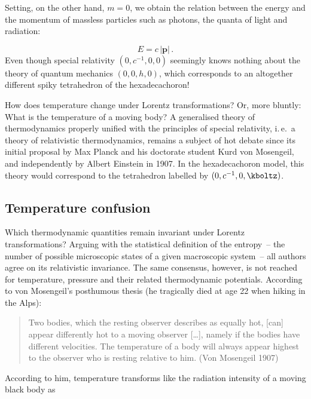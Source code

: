 \documentclass{scrartcl}
\begin{document}
Setting, on the other hand, $m=0$, we obtain the relation between the energy and the momentum of massless particles such as photons, the quanta of light and radiation:

\begin{equation*}\label{emc2}
  E=c\, |\mathbf{p}|\,.
\end{equation*}
%
Even though special relativity $(0,c^{-1},0,0)$ seemingly knows nothing about the theory of quantum mechanics $(0,0,h,0)$, which corresponds to an altogether different spiky tetrahedron of the hexadecachoron!



\newpage {}
\label{sec:0101}

How does temperature change under Lorentz transformations? Or, more bluntly: What is the temperature of a moving body? A generalised theory of thermodynamics properly unified with the principles of special relativity, i.\,e.\ a theory of relativistic thermodynamics, remains a subject of hot debate since its initial proposal by Max Planck and his doctorate student Kurd von Mosengeil, and independently by Albert Einstein in 1907. In the hexadecachoron model, this theory would correspond to the tetrahedron labelled by $(0,c^{-1},0,\kboltz)$.


\subsection*{Temperature confusion}

Which thermodynamic quantities remain invariant under Lorentz transformations? Arguing with the statistical definition of the entropy~-- the number of possible microscopic states of a given macroscopic system~-- all authors agree on its relativistic invariance. The same consensus, however, is not reached for temperature, pressure and their related thermodynamic potentials. According to von Mosengeil’s posthumous thesis (he tragically died at age 22 when hiking in the Alps):

\begin{quote}
  Two bodies, which the resting observer describes as equally hot, [can] appear differently hot to a moving observer [\dots], namely if the bodies have different velocities. The temperature of a body will always appear highest to the observer who is resting relative to him. (Von Mosengeil 1907)
\end{quote}
%
According to him, temperature transforms like the radiation intensity of a moving black body as
\end{document}

